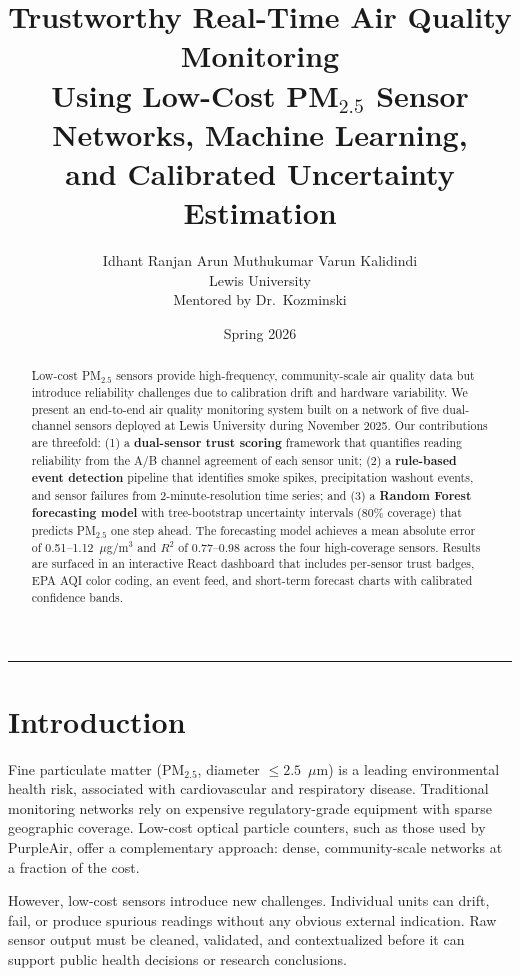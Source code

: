 \documentclass[11pt, letterpaper]{article}
\title{%
  \vspace{-1cm}
  {\Large \textbf{Trustworthy Real-Time Air Quality Monitoring}}\\[4pt]
  {\large Using Low-Cost PM$_{2.5}$ Sensor Networks, Machine Learning,\\
  and Calibrated Uncertainty Estimation}
}
\author{%
  Idhant Ranjan \quad Arun Muthukumar \quad Varun Kalidindi\\[4pt]
  \small Lewis University\\[2pt]
  \small Mentored by Dr.\ Kozminski
}
\date{Spring 2026}
\begin{document}
\maketitle
\thispagestyle{fancy}

\begin{abstract}
Low-cost PM$_{2.5}$ sensors provide high-frequency, community-scale air quality data but
introduce reliability challenges due to calibration drift and hardware variability.
We present an end-to-end air quality monitoring system built on a network of five
dual-channel sensors deployed at Lewis University during November 2025.
Our contributions are threefold: (1) a \textbf{dual-sensor trust scoring} framework
that quantifies reading reliability from the A/B channel agreement of each sensor unit;
(2) a \textbf{rule-based event detection} pipeline that identifies smoke spikes,
precipitation washout events, and sensor failures from 2-minute-resolution time series;
and (3) a \textbf{Random Forest forecasting model} with tree-bootstrap uncertainty
intervals (80\% coverage) that predicts PM$_{2.5}$ one step ahead.
The forecasting model achieves a mean absolute error of 0.51--1.12~$\mu$g/m$^3$ and
$R^2$ of 0.77--0.98 across the four high-coverage sensors.
Results are surfaced in an interactive React dashboard that includes per-sensor
trust badges, EPA AQI color coding, an event feed, and short-term forecast charts
with calibrated confidence bands.
\end{abstract}

\tableofcontents
\vspace{1em}
\hrule
\vspace{1em}

\section{Introduction}

Fine particulate matter (PM$_{2.5}$, diameter $\leq 2.5$~$\mu$m) is a leading
environmental health risk, associated with cardiovascular and respiratory disease.
Traditional monitoring networks rely on expensive regulatory-grade equipment with
sparse geographic coverage.
Low-cost optical particle counters, such as those used by PurpleAir, offer a
complementary approach: dense, community-scale networks at a fraction of the cost.

However, low-cost sensors introduce new challenges.
Individual units can drift, fail, or produce spurious readings without any
obvious external indication.
Raw sensor output must be cleaned, validated, and contextualized before it can
support public health decisions or research conclusions.
\end{document}
